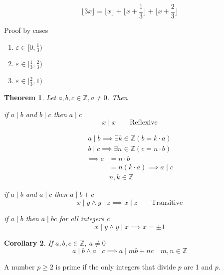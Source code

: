 \documentclass[letterpaper, 12pt]{article}
\newtheorem{theorem}{Theorem}[section]
\newtheorem{corollary}[theorem]{Corollary}
\newenvironment{proof}[1][Proof]{\begin{trivlist}
\item[\hskip \labelsep {\bfseries #1}]}{\end{trivlist}}
\newenvironment{definition}[1][Definition]{\begin{trivlist}
\item[\hskip \labelsep {\bfseries #1}]}{\end{trivlist}}
\newenvironment{example}[1][Example]{\begin{trivlist}
\item[\hskip \labelsep {\bfseries #1}]}{\end{trivlist}}
\newcommand{\Z}{\mathbb{Z}}
\newcommand{\0}{\emptyset}
\begin{document}
    \begin{example}
        \[\lfloor 3x \rfloor = \lfloor x \rfloor + \lfloor x + \frac{1}{3} \rfloor 
        + \lfloor x + \frac{2}{3} \rfloor\]
        \begin{proof}
            Proof by cases
            \begin{enumerate}
                \item $\varepsilon \in [0, \frac{1}{3})$
                \item $\varepsilon \in [\frac{1}{3}, \frac{2}{3})$
                \item $\varepsilon \in [\frac{2}{3}, 1)$
            \end{enumerate}
        \end{proof}
    \end{example}
    \begin{theorem}
        Let $a, b, c \in \Z, a \ne 0$. Then 
        \begin{enumerate}
            \item if $a \mid b$ and $b \mid c$ then $a \mid c$
            \[x \mid x \qquad \text{Reflexive}\]
            \begin{proof}
                \begin{gather*}
                    a \mid b \implies \exists k \in \Z (b = k \cdot a) \\
                    b \mid c \implies \exists n \in \Z (c = n \cdot b)
                \end{gather*}
                \begin{align*}
                    \implies c &= n \cdot b \\
                    &= n(k \cdot a) \implies a \mid c \\
                    &n, k \in \Z
                \end{align*}
            \end{proof}
            \item if $a \mid b$ and $a \mid c$ then $a \mid b + c$
            \[x \mid y \wedge y \mid z \implies x \mid z \qquad \text{Transitive}\]
            \item if $a \mid b$ then $a \mid bc$ for all integers $c$
            \[x \mid y \wedge y \mid x \implies x = \pm 1\]
        \end{enumerate}
    \end{theorem}
    \begin{corollary}
        If $a, b, c \in \Z$, $a \ne 0$ \\
        \[a \mid b \wedge a \mid c \implies a \mid mb + nc \quad m, n \in \Z\]
    \end{corollary}
    \begin{definition}
        A number $p \ge 2$ is prime if the only integers that divide $p$ are 1 and $p$.
    \end{definition}
\end{document}
